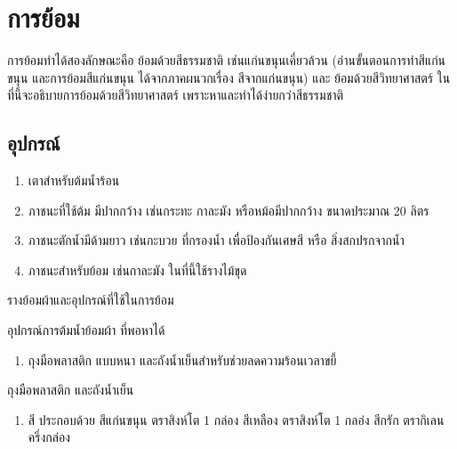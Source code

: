 \chapter{การย้อม}

การย้อมทำได้สองลักษณะคือ ย้อมด้วยสีธรรมชาติ เช่นแก่นขนุนเคี่ยวล้วน
(อ่านขั้นตอนการทำสีแก่นขนุน และการย้อมสีแก่นขนุน ได้จากภาคผนวกเรื่อง
สีจากแก่นขนุน) และ ย้อมด้วยสีวิทยาศาสตร์
ในที่นี้จะอธิบายการย้อมด้วยสีวิทยาศาสตร์
เพราะหาและทำได้ง่ายกว่าสีธรรมชาติ

\section{อุปกรณ์}

\begin{enumerate}
\def\labelenumi{(\arabic{enumi})}
\item
  เตาสำหรับต้มน้ำร้อน
\item
  ภาชนะที่ใช้ต้ม มีปากกว้าง เช่นกระทะ กาละมัง หรือหม้อมีปากกว้าง
  ขนาดประมาณ 20 ลิตร
\item
  ภาชนะตักน้ำมีด้ามยาว เช่นกะบวย ที่กรองน้ำ เพื่อป้องกันเศษสี หรือ
  สิ่งสกปรกจากน้ำ
\item
  ภาชนะสำหรับย้อม เช่นกาละมัง ในที่นี้ใช้รางไม้ขุด
\end{enumerate}


รางย้อมผ้าและอุปกรณ์ที่ใช้ในการย้อม


อุปกรณ์การต้มน้ำย้อมผ้า ที่พอหาได้

\begin{enumerate}
\def\labelenumi{(\arabic{enumi})}
\setcounter{enumi}{4}
\tightlist
\item
  ถุงมือพลาสติก แบบหนา และถังน้ำเย็นสำหรับช่วยลดความร้อนเวลาขยี้
\end{enumerate}


ถุงมือพลาสติก และถังน้ำเย็น

\begin{enumerate}
\def\labelenumi{(\arabic{enumi})}
\setcounter{enumi}{5}
\tightlist
\item
  สี ประกอบด้วย สีแก่นขนุน ตราสิงห์โต 1 กล่อง สีเหลือง ตราสิงห์โต 1
  กลอ่ง สีกรัก ตรากิเลน ครึ่งกล่อง
\end{enumerate}


